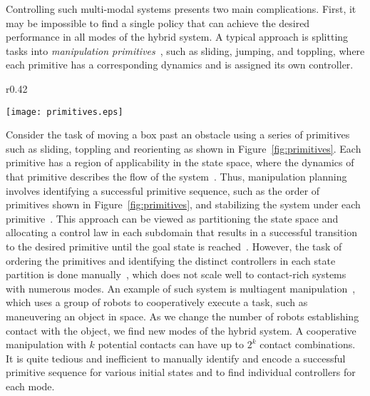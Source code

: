 %
Controlling such multi-modal systems presents two main complications. 
%
First, it may be impossible to find a single policy that can achieve the desired
performance in all modes of the hybrid system.
%
A typical approach is splitting tasks into \textit{manipulation
primitives}~\cite{nonprehensile_survey,rodyman,lynch2003control}, such as
sliding, jumping, and toppling, where each primitive has a corresponding
dynamics and is assigned its own controller. 
%
\begin{wrapfigure}{r}{0.42\textwidth}
    \vspace{-9mm}
     \begin{center}
     \texttt{[image: primitives.eps]}
     \vspace{-5mm}
     \end{center}
     \vspace{-2mm}
     \caption{Manipulation primitive sequence for manuvering a box past an obstacle}
     \label{fig:primitives}
     \vspace{-5mm}
\end{wrapfigure}
%
Consider the task of moving a box past an obstacle using a series of primitives
such as sliding, toppling and reorienting as shown in
Figure~\ref{fig:primitives}.
%
Each primitive has a region of applicability in the state space, where the
dynamics of that primitive describes the flow of the
system~\cite{lynch1999dynamic}.
%
Thus, manipulation planning involves identifying a successful primitive
sequence, such as the order of primitives shown in Figure~\ref{fig:primitives},
and stabilizing the system under each
primitive~\cite{erdmann1998exploration,yashima2003randomized}.  
%
This approach can be viewed as partitioning the state space and allocating a
control law in each subdomain that results in a successful transition to the
desired primitive until the goal state is reached~\cite{woodruff2017planning}.
%
However, the task of ordering the primitives and identifying the distinct
controllers in each state partition is done
manually~\cite{erdmann1998exploration,woodruff2017planning}, which does not scale
well to contact-rich systems with numerous modes. 
%
An example of such system is multiagent
manipulation~\cite{ashenafi2021nonholonomic}, which uses a group of robots to
cooperatively execute a task, such as maneuvering an object in space. 
%
As we change the number of robots establishing contact with the object, we find
new modes of the hybrid system.
%
A cooperative manipulation with $k$ potential contacts can have up to $2^k$
contact combinations. 
%
It is quite tedious and inefficient to manually identify and encode a successful
primitive sequence for various initial states and to find individual controllers
for each mode. 
%

